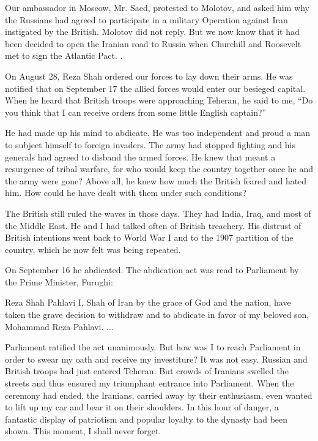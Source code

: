 Our ambassador in Moscow, Mr. Saed, protested to Molotov, and asked him why the Russians had agreed to participate in a military Operation against Iran instigated by the British. Molotov did not reply. But we now know that it had been decided to open the Iranian road to Russia when Churchill and Roosevelt met to sign the Atlantic Pact. . 

On August 28, Reza Shah ordered our forces to lay down their arms. He was notified that on September 17 the allied forces would enter our besieged capital. When he heard that British troops were approaching Teheran, he said to me, “Do you think that I can receive orders from some little English captain?” 

He had made up his mind to abdicate. He was too independent and proud a man to subject himself to foreign invaders. The army had stopped fighting and his generals had agreed to disband the armed forces. He knew that meant a resurgence of tribal warfare, for who would keep the country together once he and the army were gone? Above all, he knew how much the British feared and hated him. How could he have dealt with them under such conditions? 

The British still ruled the waves in those days. They had India, Iraq, and most of the Middle East. He and I had talked often of British treachery. His distrust of British intentions went back to World War I and to the 1907 partition of the country, which he now felt was being repeated. 

On September 16 he abdicated. The abdication act was read to Parliament by the Prime Minister, Furughi: 

\begin{chapquote}{Reza Shah Pahlavi}
I, Shah of Iran by the grace of God and the nation, have taken the grave decision to withdraw and to abdicate in favor of my beloved son, Mohammad Reza Pahlavi. ... 
\end{chapquote}

Parliament ratified the act unanimously. But how was I to reach Parliament in order to swear my oath and receive my investiture? It was not easy. Russian and British troops had just entered Teheran. But crowds of Iranians swelled the streets and thus ensured my triumphant entrance into Parliament. When the ceremony had ended, the Iranians, carried away by their enthusiasm, even wanted to lift up my car and bear it on their shoulders. In this hour of danger, a fantastic display of patriotism and popular loyalty to the dynasty had been shown. This moment, I shall never forget. 

